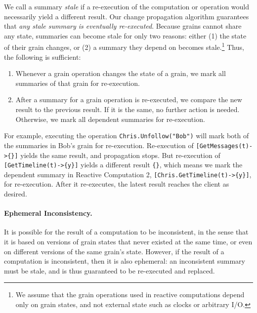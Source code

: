 We call a summary \emph{stale} if a re-execution of the computation or operation would necessarily yield a different result. Our change propagation algorithm guarantees that \emph{any stale summary is eventually re-executed}. Because grains cannot share any state, summaries can become stale for only two reasons: either (1) the state of their grain changes, or (2) a summary they depend on becomes stale.\footnote{We assume that the grain operations used in reactive computations depend only on grain states, and not external state such as clocks or arbitrary I/O.} Thus, the following is sufficient:
\begin{enumerate}
\item Whenever a grain operation changes the state of a grain, we mark all summaries of that grain for re-execution.
\item After a summary for a grain operation is re-executed, we compare the new result to the previous result. If it is the same, no further action is needed. Otherwise, we mark all dependent summaries for re-execution.
\end{enumerate}
 
\noindent For example, executing the operation \lstinline|Chris.Unfollow("Bob")| will mark both of the summaries in Bob's grain for re-execution. Re-execution of \lstinline|[GetMessages(t)->{}]| yields the same result, and propagation stops. But re-execution of \lstinline|[GetTimeline(t)->{y}]| yields a different result \lstinline|{}|, which means we mark the dependent summary in Reactive Computation 2, \lstinline|[Chris.GetTimeline(t)->{y}]|, for re-execution. After it re-executes, the latest result reaches the client as desired.

\paragraph{Ephemeral Inconsistency. }  
It is possible for the result of a computation to be inconsistent, in the sense that it is based on versions of grain states that never existed at the same time, or even on different versions of the same grain's state. However, if the result of a computation is inconsistent, then it is also ephemeral: an inconsistent summary must be stale, and is thus guaranteed to be re-executed and replaced.

